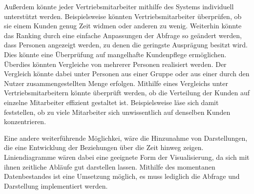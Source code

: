 Außerdem könnte jeder Vertriebsmitarbeiter mithilfe des Systems individuell unterstützt werden. Beispielsweise könnten Vertriebsmitarbeiter überprüfen, ob sie einem Kunden genug Zeit widmen oder anderen zu wenig. Weiterhin könnte das Ranking durch eine einfache Anpassungen der Abfrage so geändert werden, dass Personen angezeigt werden, zu denen die geringste Ausprägung besitzt wird. Dies könnte eine Überprüfung auf mangelhafte Kundenpflege ermöglichen. 
Überdies könnten Vergleiche von mehrerer Personen realisiert werden. Der Vergleich könnte dabei unter Personen aus einer Gruppe oder aus einer durch den Nutzer zusammengestellten Menge erfolgen. Mithilfe eines Vergleichs unter Vertriebsmitarbeitern könnte überprüft werden, ob die Verteilung der Kunden auf einzelne Mitarbeiter effizient gestaltet ist. Beispielsweise läse sich damit feststellen, ob zu viele Mitarbeiter sich unwissentlich auf denselben Kunden konzentrieren.

Eine andere weiterführende Möglichkei, wäre die Hinzunahme von Darstellungen, die eine Entwicklung der Beziehungen über die Zeit hinweg zeigen. Liniendiagramme wären dabei eine geeignete Form der Visualisierung, da sich mit ihnen zeitliche Abläufe gut darstellen lassen. Mithilfe des momentanen Datenbestandes ist eine Umsetzung möglich, es muss lediglich die Abfrage und Darstellung implementiert werden.  

